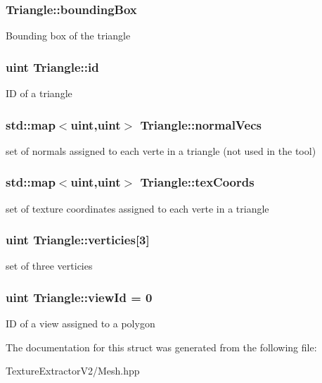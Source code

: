 \subsubsection[{bounding\+Box}]{ Triangle\+::bounding\+Box}\label{struct_triangle_a980bbf270a13c5ac9112e6e8c8c2ea89}
Bounding box of the triangle \hypertarget{struct_triangle_a2b02bfd83feba5fe297836b900a62c92}{}
\subsubsection[{id}]{\setlength{\rightskip}{0pt plus 5cm}uint Triangle\+::id}\label{struct_triangle_a2b02bfd83feba5fe297836b900a62c92}
I\+D of a triangle \hypertarget{struct_triangle_a9e82ef210ec3746af058c3b4793bd34d}{}
\subsubsection[{normal\+Vecs}]{\setlength{\rightskip}{0pt plus 5cm}std\+::map$<$uint,uint$>$ Triangle\+::normal\+Vecs}\label{struct_triangle_a9e82ef210ec3746af058c3b4793bd34d}
set of normals assigned to each verte in a triangle (not used in the tool) \hypertarget{struct_triangle_a2d3dc46484a1d1cc2802caaaa4a5f1cf}{}
\subsubsection[{tex\+Coords}]{\setlength{\rightskip}{0pt plus 5cm}std\+::map$<$uint,uint$>$ Triangle\+::tex\+Coords}\label{struct_triangle_a2d3dc46484a1d1cc2802caaaa4a5f1cf}
set of texture coordinates assigned to each verte in a triangle \hypertarget{struct_triangle_ae6371f947daaa0debff04c10b6fadf74}{}
\subsubsection[{verticies}]{\setlength{\rightskip}{0pt plus 5cm}uint Triangle\+::verticies\mbox{[}3\mbox{]}}\label{struct_triangle_ae6371f947daaa0debff04c10b6fadf74}
set of three verticies \hypertarget{struct_triangle_a18682ece909b0d90107ac391f37f5cd4}{}
\subsubsection[{view\+Id}]{\setlength{\rightskip}{0pt plus 5cm}uint Triangle\+::view\+Id = 0}\label{struct_triangle_a18682ece909b0d90107ac391f37f5cd4}
I\+D of a view assigned to a polygon 

The documentation for this struct was generated from the following file\+:\begin{DoxyCompactItemize}
\item 
Texture\+Extractor\+V2/Mesh.\+hpp\end{DoxyCompactItemize}
